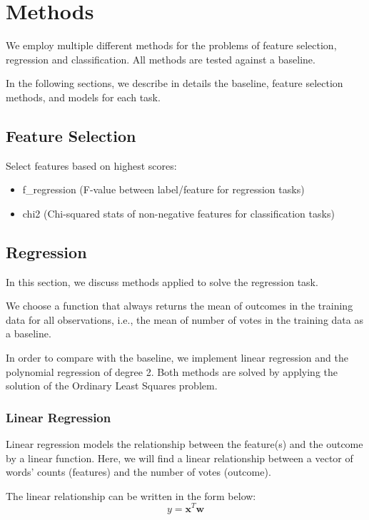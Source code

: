 \section{Methods}
\label{sec:two}

We employ multiple different methods for the problems of feature selection,
regression and classification. All methods are tested against a baseline. 

In the following sections, we describe in details the baseline, feature selection methods, and models for each task. 
\subsection{Feature Selection}

Select features based on highest scores:

\begin{itemize}
\item f\_regression (F-value between label/feature for regression tasks)
\item chi2 (Chi-squared stats of non-negative features for classification tasks)
\end{itemize}

\subsection{Regression}
In this section, we discuss methods applied to solve the regression task.

We choose a function that always returns the mean of outcomes in the training data for all observations, i.e., the mean of number of votes in the training data as a baseline.

In order to compare with the baseline, we implement linear regression and the polynomial regression of degree 2. Both methods are solved by applying the solution of the Ordinary Least Squares problem.

\subsubsection{Linear Regression}
Linear regression models the relationship between the feature(s) and the outcome by a linear function. Here, we will find a linear relationship between a vector of words' counts (features) and the number of votes (outcome). 

The linear relationship can be written in the form below:
\begin{equation*}
y = \mathbf{x}^T\mathbf{w}
\end{equation*}

